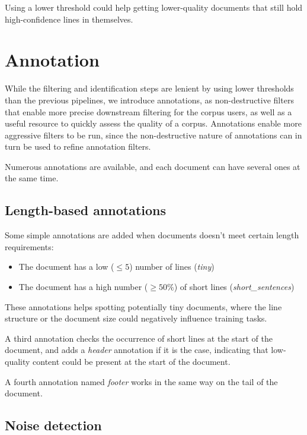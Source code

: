 Using a lower threshold could help getting lower-quality documents that still hold high-confidence lines in themselves.

\section{Annotation}

While the filtering and identification steps are lenient by using lower thresholds than the previous pipelines, we introduce annotations, as non-destructive filters that enable more precise downstream filtering for the corpus users, as well as a useful resource to quickly assess the quality of a corpus. Annotations enable more aggressive filters to be run, since the non-destructive nature of annotations can in turn be used to refine annotation filters.

Numerous annotations are available, and each document can have several ones at the same time.

\subsection{Length-based annotations}

Some simple annotations are added when documents doesn't meet certain length requirements:

\begin{itemize}
    \item The document has a low ($\le 5$) number of lines (\emph{tiny})
    \item The document has a high number ($\ge 50\%$) of short lines (\emph{short\_sentences})
\end{itemize}

These annotations helps spotting potentially tiny documents, where the line structure or the document size could negatively influence training tasks.

A third annotation checks the occurrence of short lines at the start of the document, and adds a \emph{header} annotation if it is the case, indicating that low-quality content could be present at the start of the document.

A fourth annotation named \emph{footer} works in the same way on the tail of the document.

\subsection{Noise detection}

